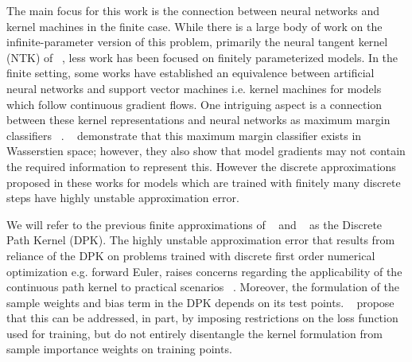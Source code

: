 The main focus for this work is the connection between neural networks and kernel machines in the finite case. While there is a large body of work on the infinite-parameter version of this problem, primarily the neural tangent kernel (NTK) of ~\citet{jacot2018neural}, less work has been focused on finitely parameterized models.   %
In the finite setting, some works \citep{domingos2020every, chen2021equivalence} have established an equivalence between artificial neural networks and support vector machines i.e. kernel machines for models which follow continuous gradient flows. One intriguing aspect is a connection between these kernel representations and neural networks as maximum margin classifiers ~\citep{chen2021equivalence, chizat2020maxmargin}. ~\citet{shah2021input} demonstrate that this maximum margin classifier exists in Wasserstien space; however, they also show that model gradients may not contain the required information to represent this. However the discrete approximations proposed in these works for models which are trained with finitely many discrete steps have highly unstable approximation error. 

We will refer to the previous finite approximations of ~\citet{domingos2020} and ~\citet{chen2021equivalence} as the Discrete Path Kernel (DPK). The highly unstable approximation error that results from reliance of the DPK on problems trained with discrete first order numerical optimization e.g. forward Euler, raises concerns regarding the applicability of the continuous path kernel to practical scenarios ~\citep{incudini2022quantum}.
Moreover, the formulation of the sample weights and bias term in the DPK depends on its test points. ~\citet{chen2021equivalence} propose that this can be addressed, in part, by imposing restrictions on the loss function used for training, but do not entirely disentangle the kernel formulation from sample importance weights on training points.

